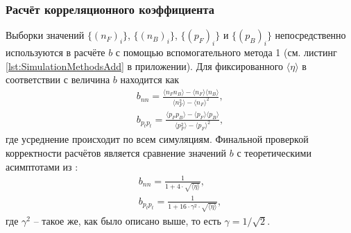 \subsubsection{Расчёт корреляционного коэффициента}
Выборки значений $\{ (n_F)_i \}$, $\{ (n_B)_i \}$, $\{ (p_F)_i \}$ и $\{ (p_B)_i \}$ непосредственно используются в расчёте $b$ с помощью вспомогательного метода 1 (см. листинг \ref{lst:SimulationMethodsAdd} в приложении). Для фиксированного $\langle \eta \rangle$ в соответствии с \cite{bStatement} величина $b$ находится как 
\begin{equation} \label{eq:bCalc}
\begin{split}
	b_{nn} = \frac{\langle n_F n_B \rangle - \langle n_F \rangle \langle n_B \rangle}{\langle n_F^2 \rangle - \langle n_F \rangle^2}, \\
	b_{p_tp_t} = \frac{\langle p_F p_B \rangle - \langle p_F \rangle \langle p_B \rangle}{\langle p_F^2 \rangle - \langle p_F \rangle^2},
\end{split}
\end{equation}
где усреднение происходит по всем симуляциям. Финальной проверкой корректности расчётов является сравнение значений $b$ с теоретическими асимптотами из \cite{dissert}:
\begin{equation} \label{eq:bTheor}
\begin{split}
	b_{nn} = \frac{1}{1 + 4 \cdot \sqrt{\langle \eta \rangle}}, \quad \\
	b_{p_tp_t} = \frac{1}{1 + 16 \cdot \gamma^2 \cdot \sqrt{\langle \eta \rangle}},
\end{split}
\end{equation}
где $\gamma^2$ -- такое же, как было описано выше, то есть $\gamma = 1/\sqrt{2}$.
